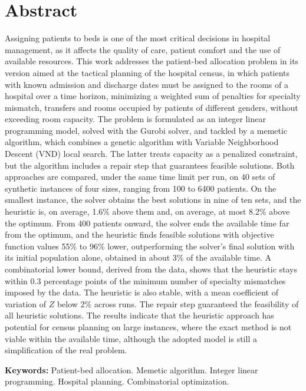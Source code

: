 \chapter*{Abstract}

Assigning patients to beds is one of the most critical decisions in hospital management, as it affects the quality of care, patient comfort and the use of available resources. This work addresses the patient-bed allocation problem in its version aimed at the tactical planning of the hospital census, in which patients with known admission and discharge dates must be assigned to the rooms of a hospital over a time horizon, minimizing a weighted sum of penalties for specialty mismatch, transfers and rooms occupied by patients of different genders, without exceeding room capacity. The problem is formulated as an integer linear programming model, solved with the Gurobi solver, and tackled by a memetic algorithm, which combines a genetic algorithm with Variable Neighborhood Descent (VND) local search. The latter treats capacity as a penalized constraint, but the algorithm includes a repair step that guarantees feasible solutions. Both approaches are compared, under the same time limit per run, on 40 sets of synthetic instances of four sizes, ranging from 100 to 6400 patients. On the smallest instance, the solver obtains the best solutions in nine of ten sets, and the heuristic is, on average, 1.6\% above them and, on average, at most 8.2\% above the optimum. From 400 patients onward, the solver ends the available time far from the optimum, and the heuristic finds feasible solutions with objective function values 55\% to 96\% lower, outperforming the solver's final solution with its initial population alone, obtained in about 3\% of the available time. A combinatorial lower bound, derived from the data, shows that the heuristic stays within 0.3 percentage points of the minimum number of specialty mismatches imposed by the data. The heuristic is also stable, with a mean coefficient of variation of $Z$ below 2\% across runs. The repair step guaranteed the feasibility of all heuristic solutions. The results indicate that the heuristic approach has potential for census planning on large instances, where the exact method is not viable within the available time, although the adopted model is still a simplification of the real problem.

\vspace{0.5cm}
\noindent\textbf{Keywords:} Patient-bed allocation. Memetic algorithm. Integer linear programming. Hospital planning. Combinatorial optimization.
